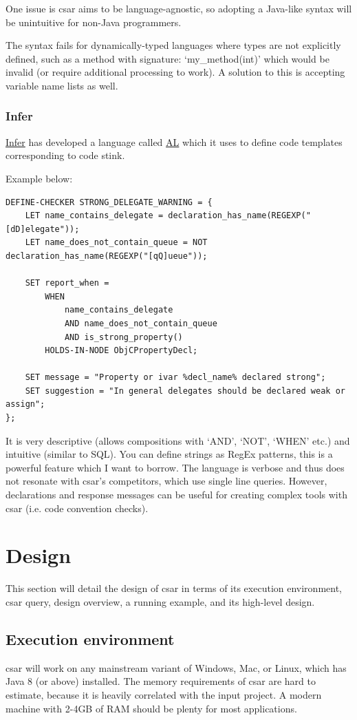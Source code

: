 \documentclass[12pt, letterpaper]{article}
\begin{document}
One issue is csar aims to be language-agnostic, so adopting a Java-like syntax will be unintuitive for non-Java programmers.

The syntax fails for dynamically-typed languages where types are not explicitly defined, such as a method with signature: `my\_method(int)' which would be invalid (or require additional processing to work).
A solution to this is accepting variable name lists as well.

\subsubsection{Infer}
\href{https://github.com/facebook/infer}{Infer} has developed a language called \href{https://code.facebook.com/posts/277643589367408/}{AL} which it uses to define code templates corresponding to code stink.

Example below:
\begin{lstlisting}
DEFINE-CHECKER STRONG_DELEGATE_WARNING = {
    LET name_contains_delegate = declaration_has_name(REGEXP("[dD]elegate"));
    LET name_does_not_contain_queue = NOT declaration_has_name(REGEXP("[qQ]ueue"));

    SET report_when =
        WHEN
            name_contains_delegate
            AND name_does_not_contain_queue
            AND is_strong_property()
        HOLDS-IN-NODE ObjCPropertyDecl;

    SET message = "Property or ivar %decl_name% declared strong";
    SET suggestion = "In general delegates should be declared weak or assign";
};
\end{lstlisting}

It is very descriptive (allows compositions with `AND', `NOT', `WHEN' etc.) and intuitive (similar to SQL).
You can define strings as RegEx patterns, this is a powerful feature which I want to borrow.
The language is verbose and thus does not resonate with csar's competitors, which use single line queries.
However, declarations and response messages can be useful for creating complex tools with csar (i.e. code convention checks).

\section{Design}
This section will detail the design of csar in terms of its execution environment, csar query, design overview, a running example, and its high-level design.

\subsection{Execution environment}
csar will work on any mainstream variant of Windows, Mac, or Linux, which has Java 8 (or above) installed.
The memory requirements of csar are hard to estimate, because it is heavily correlated with the input project.
A modern machine with 2-4GB of RAM should be plenty for most applications.
\end{document}
